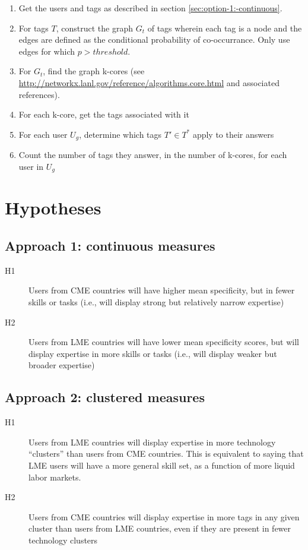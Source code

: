 \documentclass[11pt]{article}
\begin{document}
\begin{enumerate}
\item Get the users and tags as described in section \ref{sec:option-1:-continuous}.
\item For tags $T$, construct the graph $G_t$ of tags wherein each tag is a
  node and the edges are defined as the conditional probability of
  co-occurrance. Only use edges for which $p > threshold$.
\item For $G_t$, find the graph k-cores (see
  \url{http://networkx.lanl.gov/reference/algorithms.core.html} and
  associated references).
\item For each k-core, get the tags associated with it
\item For each user $U_g$, determine which tags $T' \in T^*$ apply to
  their answers
\item Count the number of tags they answer, in the number of k-cores,
  for each user in $U_g$
\end{enumerate}

\section{Hypotheses}
\label{sec:hypotheses}

\subsection{Approach 1: continuous measures}
\label{sec:appr-1:-cont}

\begin{description}
\item[H1] Users from CME countries will have higher mean specificity,
  but in fewer skills or tasks (i.e., will display strong but
  relatively narrow expertise)
\item[H2] Users from LME countries will have lower mean specificity
  scores, but will display expertise in more skills or tasks (i.e.,
  will display weaker but broader expertise)
\end{description}

\subsection{Approach 2: clustered measures}
\label{sec:appr-2:-clust}

\begin{description}
\item[H1] Users from LME countries will display expertise in more
  technology ``clusters'' than users from CME countries. This is
  equivalent to saying that LME users will have a more general skill
  set, as a function of more liquid labor markets.
\item[H2] Users from CME countries will display expertise in more tags
  in any given cluster than users from LME countries, even if they are
  present in fewer technology clusters
\end{description}
\end{document}
